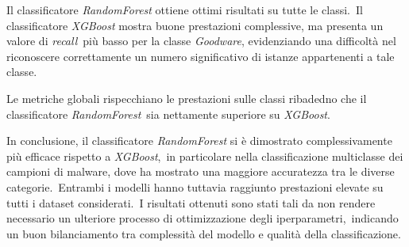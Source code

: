 \FloatBarrier

Il classificatore \textit{RandomForest} ottiene ottimi risultati su tutte le classi.\
Il classificatore \textit{XGBoost} mostra buone prestazioni complessive, ma presenta un valore di \textit{recall}\
più basso per la classe \textit{Goodware}, evidenziando una difficoltà nel riconoscere correttamente un numero significativo di istanze appartenenti a tale classe.

\begin{figure}[t]
    \centering
    \adjustbox{max width=1.4\linewidth, max height=1.2\textheight}{%
        
    }
    \caption{}
    \label{fig:octack-mtrx-rf}
\end{figure}

\FloatBarrier

Le metriche globali rispecchiano le prestazioni sulle classi ribadedno che il classificatore \textit{RandomForest}\
sia nettamente superiore su \textit{XGBoost}.


In conclusione, il classificatore \textit{RandomForest} si è dimostrato complessivamente più efficace rispetto a \textit{XGBoost},\
in particolare nella classificazione multiclasse dei campioni di malware, dove ha mostrato una maggiore accuratezza tra le diverse categorie.\
Entrambi i modelli hanno tuttavia raggiunto prestazioni elevate su tutti i dataset considerati.\
I risultati ottenuti sono stati tali da non rendere necessario un ulteriore processo di ottimizzazione degli iperparametri,\
indicando un buon bilanciamento tra complessità del modello e qualità della classificazione.
